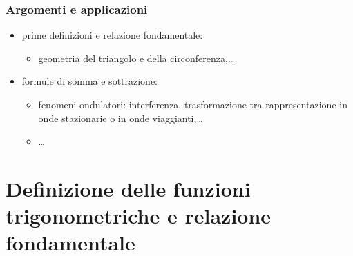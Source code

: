 \documentclass[letterpaper,10pt,italian]{jupyterBook}
\begin{document}
\subsubsection*{Argomenti e applicazioni}
\begin{itemize}
\item {} 
\sphinxAtStartPar
prime definizioni e relazione fondamentale:
\begin{itemize}
\item {} 
\sphinxAtStartPar
geometria del triangolo e della circonferenza,…

\end{itemize}

\item {} 
\sphinxAtStartPar
formule di somma e sottrazione:
\begin{itemize}
\item {} 
\sphinxAtStartPar
fenomeni ondulatori: interferenza, trasformazione tra rappresentazione in onde stazionarie o in onde viaggianti,…

\item {} 
\sphinxAtStartPar
…

\end{itemize}

\end{itemize}


\section{Definizione delle funzioni trigonometriche e relazione fondamentale}
\label{\detokenize{ch/trigonometry:definizione-delle-funzioni-trigonometriche-e-relazione-fondamentale}}
\end{document}
